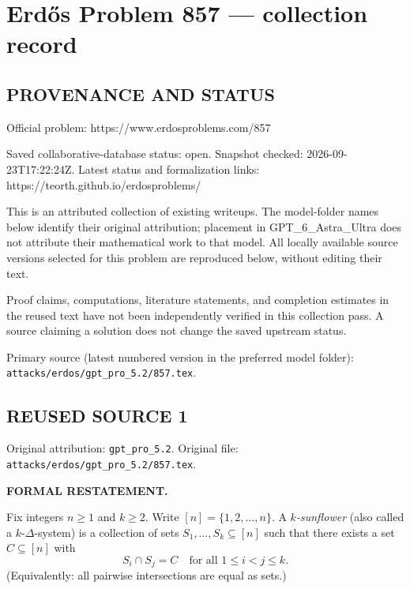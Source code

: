 \section*{Erd\H{o}s Problem 857 --- collection record}

\subsection*{PROVENANCE AND STATUS}
Official problem: https://www.erdosproblems.com/857

Saved collaborative-database status: open.
Snapshot checked: 2026-09-23T17:22:24Z.
Latest status and formalization links: https://teorth.github.io/erdosproblems/

This is an attributed collection of existing writeups. The model-folder names below identify their original attribution; placement in GPT\_6\_Astra\_Ultra does not attribute their mathematical work to that model. All locally available source versions selected for this problem are reproduced below, without editing their text.

Proof claims, computations, literature statements, and completion estimates in the reused text have not been independently verified in this collection pass. A source claiming a solution does not change the saved upstream status.

Primary source (latest numbered version in the preferred model folder): \texttt{attacks/erdos/gpt\_pro\_5.2/857.tex}.

\subsection*{REUSED SOURCE 1}
Original attribution: \texttt{gpt\_pro\_5.2}.
Original file: \texttt{attacks/erdos/gpt\_pro\_5.2/857.tex}.


\noindent\textbf{FORMAL RESTATEMENT.}

Fix integers $n\ge 1$ and $k\ge 2$. Write $[n]=\{1,2,\dots,n\}$. A \emph{$k$-sunflower} (also called a $k$-$\Delta$-system) is a collection of sets $S_1,\dots,S_k\subseteq[n]$ such that there exists a set $C\subseteq[n]$ with
\[
S_i\cap S_j = C\quad\text{for all }1\le i<j\le k.
\]
(Equivalently: all pairwise intersections are equal as sets.)

